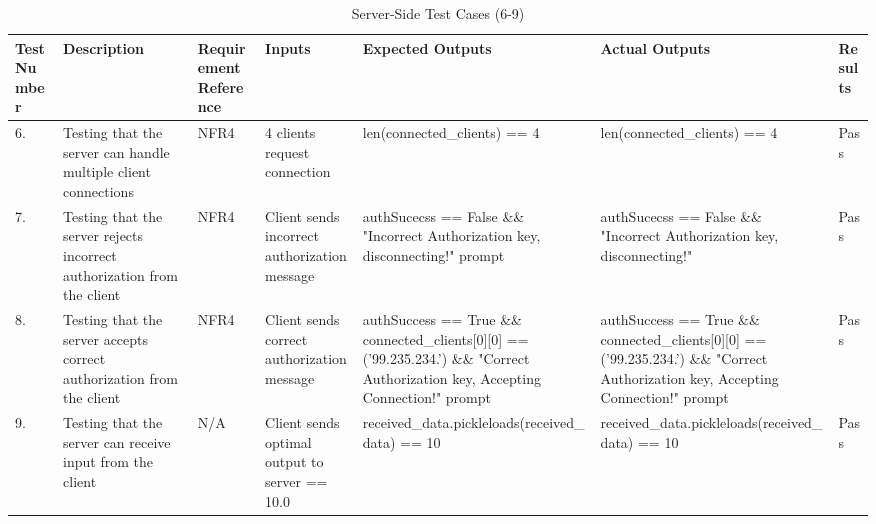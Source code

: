 \documentclass[12pt, titlepage]{article}
\begin{document}
\fancyhf{}
\fancyhead[C]{\thepage}
\renewcommand{\headrulewidth}{0pt}
\pagestyle{plain}

\begin{center}
    \begin{table}[H]
        \centering
        \begin{tabular}{|p{1cm}|p{2.2cm}|p{2.5cm}|p{2.7cm}|p{2.4cm}|p{2.4cm}|p{1.3cm}|}
        \hline
        \bf Test Number & \bf Description & \bf Requirement Reference & \bf Inputs & \bf Expected Outputs & \bf Actual Outputs & \bf Results \\
        \hline
        6. & Testing that the server can handle multiple client connections & NFR4 & 4  clients request connection & len(connected\newline\_clients) == 4 & len(connected\newline\_clients) == 4 & Pass\\
        \hline
        7. & Testing that the server rejects incorrect authorization from the client & NFR4 & Client sends incorrect authorization message & authSucecss == False \&\& "Incorrect Authorization key, disconnecting!" prompt & authSucecss == False \&\& "Incorrect Authorization key, disconnecting!" & Pass\\
        \hline
        8. & Testing that the server accepts correct authorization from the client & NFR4 & Client sends correct authorization message & authSuccess == True \&\& connected\newline \_clients[0][0] == ('99.235.234.\newline43') \&\& "Correct Authorization key, Accepting Connection!" prompt & authSuccess == True \&\& connected\newline\_clients[0][0] == ('99.235.234.\newline43') \&\& "Correct Authorization key, Accepting Connection!" prompt & Pass\\
        \hline
        9. & Testing that the server can receive input from the client & N/A & Client sends optimal output to server == 10.0 & received\_data.\newline pickleloads(re\newline ceived\_data) == 10 & received\_data.\newline pickleloads(re\newline ceived\_data) == 10 & Pass\\
        \hline
        \end{tabular}
        \caption{Server-Side Test Cases (6-9)}
        \label{tab:my_label4}
    \end{table}
\end{center}
\end{document}
